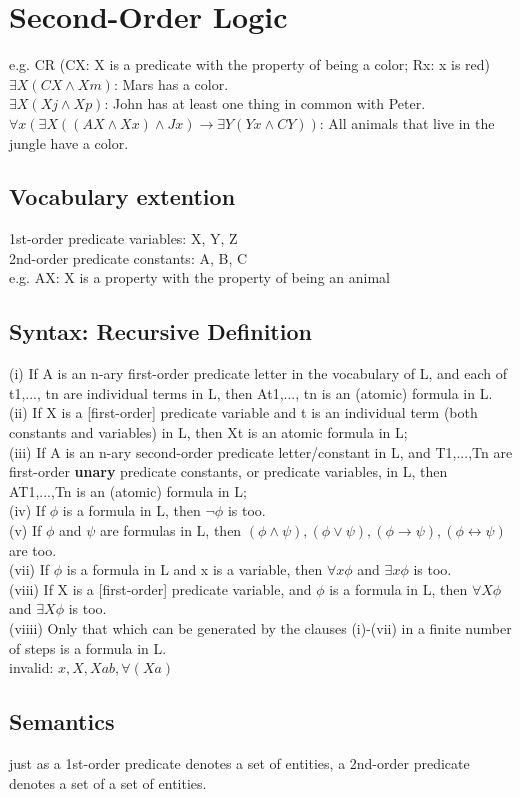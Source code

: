\section{Second-Order Logic}
e.g. CR (CX: X is a predicate with the property of being a color; Rx: x is red) \\
$\exists X(CX \land Xm)$: Mars has a color. \\
$\exists X(Xj \land Xp)$: John has at least one thing in common with Peter. \\
$\forall x (\exists X ((AX \land Xx) \land Jx) \to \exists Y (Yx \land CY))$: All animals that live in the jungle have a color.
\subsection*{Vocabulary extention}
1st-order predicate variables: X, Y, Z\\
2nd-order predicate constants: A, B, C\\
e.g. AX: X is a property with the property of being an animal
\subsection*{Syntax: Recursive Definition}
(i) If A is an n-ary first-order predicate letter in the vocabulary of L, and each of t1,..., tn are individual terms in L, then At1,..., tn is an (atomic) formula in L.\\
(ii) If X is a [first-order] predicate variable and t is an individual term (both constants and variables) in L, then Xt is an atomic formula in L;\\
(iii) If A is an n-ary second-order predicate letter/constant in L, and
T1,...,Tn are first-order \textbf{unary} predicate constants, or predicate
variables, in L, then AT1,...,Tn is an (atomic) formula in L;\\
(iv) If $\phi$ is a formula in L, then $\neg \phi$ is too.\\
(v) If $\phi$ and $\psi$ are formulas in L, then $(\phi \land \psi), (\phi \lor \psi), (\phi \to \psi), (\phi \leftrightarrow \psi)$ are too.\\
(vii) If $\phi$ is a formula in L and x is a variable, then $\forall x \phi$ and $\exists x \phi$ is too.\\
(viii) If X is a [first-order] predicate variable, and $\phi$ is a formula in L, then $\forall X \phi$ and $\exists X \phi$ is too.\\
(viiii) Only that which can be generated by the clauses (i)-(vii) in a finite number of steps is a formula in L.\\
invalid: $x, X, Xab, \forall(Xa)$
\subsection*{Semantics}
just as a 1st-order predicate denotes a set of entities, a 2nd-order predicate denotes a set of a
set of entities.